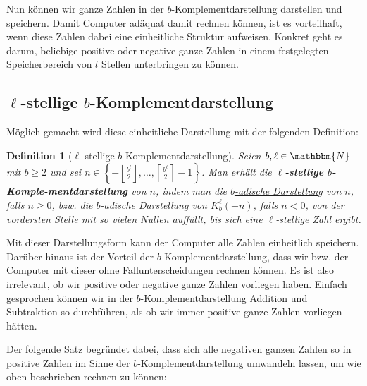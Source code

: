 \documentclass{article}
\newcommand{\N}{\mathbbm{N}} %
\newtheorem{definition}[satz]{Definition}
\begin{document}
  \vspace{\baselineskip}

  Nun können wir ganze Zahlen in der $b$-Komplementdarstellung darstellen und speichern.
  Damit Computer adäquat damit rechnen können, ist es vorteilhaft, wenn diese Zahlen dabei eine einheitliche Struktur aufweisen.
  Konkret geht es darum, beliebige positive oder negative ganze Zahlen in einem festgelegten Speicherbereich von $l$ Stellen unterbringen zu können.

\subsection{$\ell$-stellige $b$-Komplementdarstellung}
  Möglich gemacht wird diese einheitliche Darstellung mit der folgenden Definition:

  \begin{definition}[$\ell$-stellige $b$-Komplementdarstellung] \label{def:l-stellige_b-Komplementdarstellung}
    Seien $b,\ell \in \N$ mit $b \geq 2$ und sei $n \in \left\{- \left\lfloor \displaystyle\frac{b^l}{2} \right\rfloor, \dots, \left\lceil \displaystyle\frac{b^\ell}{2} \right\rceil -1 \right\}$. 
    Man erhält die \textbf{$\ell$-stellige $b$-Komple-mentdarstellung} von $n$, indem man die \hyperref[satz:b-adische_Darstellung]{$b$-adische Darstellung} von $n$, falls $n \geq 0$,
    bzw. die $b$-adische Darstellung von $K_b^\ell(-n)$, falls $n < 0$, von der vordersten Stelle mit so vielen Nullen auffüllt, bis sich eine $\ell$-stellige Zahl ergibt.
  \end{definition}

  \vspace{\baselineskip}

  Mit dieser Darstellungsform kann der Computer alle Zahlen einheitlich speichern.
  Darüber hinaus ist der Vorteil der $b$-Komplementdarstellung, dass wir bzw. der Computer mit dieser ohne Fallunterscheidungen rechnen können.
  Es ist also irrelevant, ob wir positive oder negative ganze Zahlen vorliegen haben.
  Einfach gesprochen können wir in der $b$-Komplementdarstellung Addition und Subtraktion so durchführen, als ob wir immer positive ganze Zahlen vorliegen hätten.

  Der folgende Satz begründet dabei, dass sich alle negativen ganzen Zahlen so in positive Zahlen im Sinne der $b$-Komplementdarstellung umwandeln lassen, um wie oben beschrieben rechnen zu können:
\end{document}
